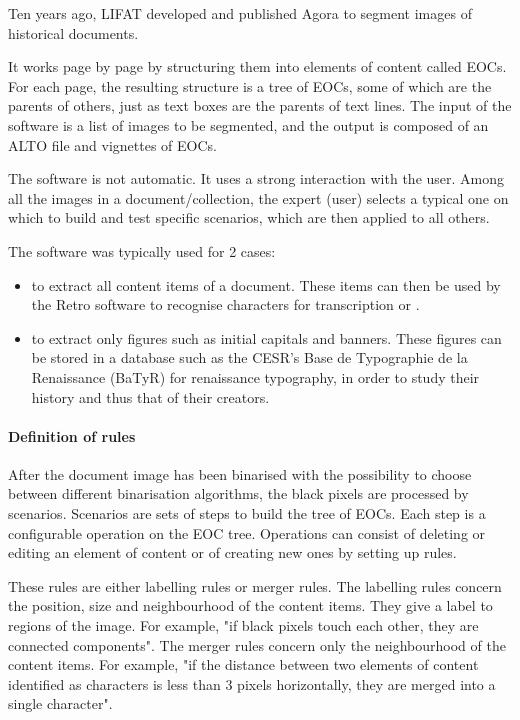 \documentclass{polytech/polytech}
\numberwithin{figure}{chapter}
\begin{document}
Ten years ago, LIFAT developed and published Agora to segment images of historical documents.

It works page by page by structuring them into elements of content called EOCs.
For each page, the resulting structure is a tree of EOCs, some of which are the parents of others, just as text boxes are the parents of text lines.
The input of the software is a list of images to be segmented, and the output is composed of an ALTO file and vignettes of EOCs.

The software is not automatic.
It uses a strong interaction with the user.
Among all the images in a document/collection, the expert (user) selects a typical one on which to build and test specific scenarios, which are then applied to all others.

The software was typically used for 2 cases:
\begin{itemize}
\item to extract all content items of a document. These items can then be used by the Retro software to recognise characters for transcription or .
\item to extract only figures such as initial capitals and banners. These figures can be stored in a database such as the CESR's Base de Typographie de la Renaissance (BaTyR) for renaissance typography, in order to study their history and thus that of their creators.
\end{itemize}

\paragraph{Definition of rules}

After the document image has been binarised with the possibility to choose between different binarisation algorithms, the black pixels are processed by scenarios.
Scenarios are sets of steps to build the tree of EOCs.
Each step is a configurable operation on the EOC tree.
Operations can consist of deleting or editing an element of content or of creating new ones by setting up rules.

These rules are either labelling rules or merger rules.
The labelling rules concern the position, size and neighbourhood of the content items.
They give a label to regions of the image.
For example, "if black pixels touch each other, they are connected components".
The merger rules concern only the neighbourhood of the content items. For example, "if the distance between two elements of content identified as characters is less than 3 pixels horizontally, they are merged into a single character".
\end{document}
